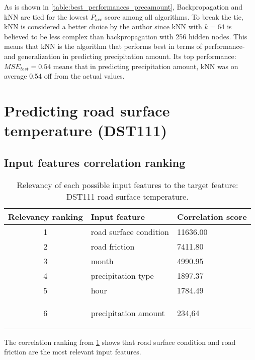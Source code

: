 	As is shown in \ref{table:best_performances_precamount}, Backpropagation and kNN are tied for the lowest $P_{acc}$ score among all algorithms. To break the tie, kNN is considered a better choice by the author since kNN with $k=64$ is believed to be less complex than backpropagation with 256 hidden nodes. This means that kNN is the algorithm that performs best in terms of performance- and generalization in predicting precipitation amount. Its top performance:  $MSE_{test} = 0.54$ means that in predicting precipitation amount, kNN was on average 0.54 off from the actual values. %


\section{Predicting road surface temperature (DST111)}
	\subsection{Input features correlation ranking}

	\begin{table}[H]
		\centering
		\caption{Relevancy of each possible input features to the target feature: DST111 road surface temperature. }
		\begin{tabular}[3]{c | l | l }
    			Relevancy ranking & Input feature & Correlation score  \\
			 \hline
			1 & road surface condition & 11636.00 \\ \hline
			2 & road friction & 7411.80 \\ \hline
			3 & month & 4990.95 \\ \hline
			4 & precipitation type & 1897.37 \\ \hline
			5 & hour & 1784.49 \\ \hline
			6 & precipitation amount & 234,64 
 
			\label{table:feature_comparison_dst111}
		\end{tabular}
	\end{table}

	The correlation ranking from \ref{table:feature_comparison_dst111} shows that road surface condition and road friction are the most relevant input features.

